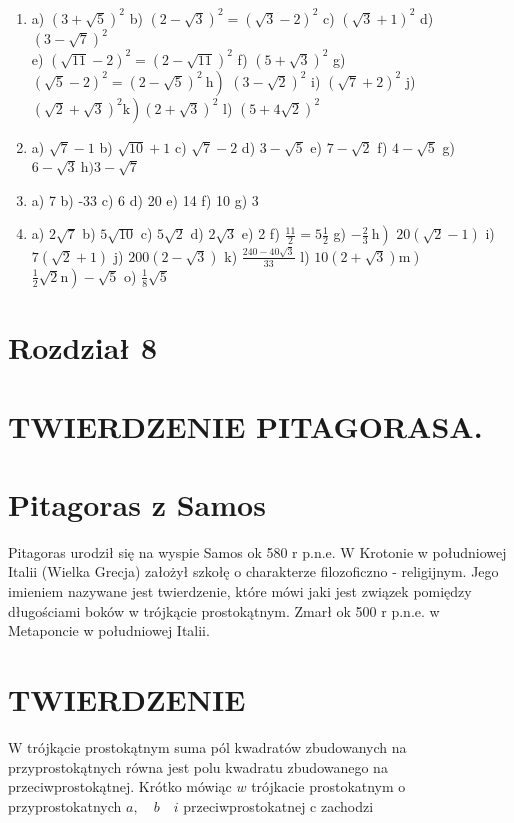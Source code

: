 \documentclass[10pt]{article}
\begin{document}
\begin{enumerate}
  \item a) \((3+\sqrt{5})^{2}\) b) \((2-\sqrt{3})^{2}=(\sqrt{3}-2)^{2}\) c) \((\sqrt{3}+1)^{2}\) d) \((3-\sqrt{7})^{2}\)\\
e) \((\sqrt{11}-2)^{2}=(2-\sqrt{11})^{2}\) f) \((5+\sqrt{3})^{2}\) g) \(\left.(\sqrt{5}-2)^{2}=(2-\sqrt{5})^{2} \mathrm{~h}\right)\) \((3-\sqrt{2})^{2}\) i) \((\sqrt{7}+2)^{2}\) j) \(\left.(\sqrt{2}+\sqrt{3})^{2} \mathrm{k}\right)(2+\sqrt{3})^{2}\) l) \((5+4 \sqrt{2})^{2}\)
  \item a) \(\sqrt{7}-1\) b) \(\sqrt{10}+1\) c) \(\sqrt{7}-2\) d) \(3-\sqrt{5}\) e) \(7-\sqrt{2}\) f) \(4-\sqrt{5}\) g) \(6-\sqrt{3} \mathrm{~h}) 3-\sqrt{7}\)
  \item a) 7 b) -33 c) 6 d) 20 e) 14 f) 10 g) 3
  \item a) \(2 \sqrt{7}\) b) \(5 \sqrt{10}\) c) \(5 \sqrt{2}\) d) \(2 \sqrt{3}\) e) 2 f) \(\frac{11}{2}=5 \frac{1}{2}\) g) \(\left.-\frac{2}{3} \mathrm{~h}\right)\) \(20(\sqrt{2}-1)\) i) \(7(\sqrt{2}+1)\) j) \(200(2-\sqrt{3})\) k) \(\frac{240-40 \sqrt{3}}{33}\) l) \(\left.10(2+\sqrt{3}) \mathrm{m}\right)\) \(\left.\frac{1}{2} \sqrt{2} \mathrm{n}\right)-\sqrt{5}\) o) \(\frac{1}{8} \sqrt{5}\)
\end{enumerate}

\section*{Rozdział 8}
\section*{TWIERDZENIE PITAGORASA.}
\section*{Pitagoras z Samos}
Pitagoras urodził się na wyspie Samos ok 580 r p.n.e. W Krotonie w południowej Italii (Wielka Grecja) założył szkołę o charakterze filozoficzno - religijnym. Jego imieniem nazywane jest twierdzenie, które mówi jaki jest związek pomiędzy długościami boków w trójkącie prostokątnym. Zmarł ok 500 r p.n.e. w Metaponcie w południowej Italii.

\section*{TWIERDZENIE}
W trójkącie prostokątnym suma pól kwadratów zbudowanych na przyprostokątnych równa jest polu kwadratu zbudowanego na przeciwprostokątnej. Krótko mówiąc \(w\) trójkacie prostokatnym o przyprostokatnych \(a, \quad b \quad i\) przeciwprostokatnej c zachodzi
\end{document}
